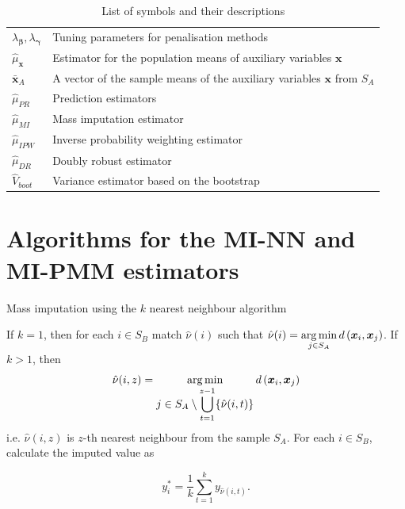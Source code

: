\documentclass[
]{jss}
\begin{document}
\begin{table}[ht!]
\begin{tabular}{ll}
$\lambda_{\boldsymbol{\beta}}, \lambda_{\boldsymbol{\gamma}}$ & Tuning parameters for penalisation methods \\
$\hat{\mu}_{\boldsymbol{x}}$ & Estimator for the population means of auxiliary variables $\boldsymbol{x}$ \\
$\bar{\boldsymbol{x}}_{A}$ & A vector of the sample means of the auxiliary variables $\boldsymbol{x}$ from $S_A$ \\ 
$\hat{\mu}_{PR}$ & Prediction estimators \\
$\hat{\mu}_{MI}$ & Mass imputation estimator \\
$\hat{\mu}_{IPW}$ & Inverse probability weighting estimator \\
$\hat{\mu}_{DR}$ & Doubly robust estimator \\
$\hat{V}_{boot}$ & Variance estimator based on the bootstrap \\
\hline
\end{tabular}
\caption{List of symbols and their descriptions}
\label{tab-list-of-symbols}
\end{table}

\section{Algorithms for the MI-NN and MI-PMM
estimators}\label{sec-details}

\begin{algorithm}[ht!]
\caption{Mass imputation using the $k$ nearest neighbour algorithm}
\label{algo-2}
\begin{algorithmic}[1]
\State If $k=1$, then for each $i \in S_B$ match $\hat{\nu}(i)$ such that
$\displaystyle \hat{\nu}(i)=
\operatornamewithlimits{arg\,min}_{j\in S_{A}}d\left(\boldsymbol{x}_i,\boldsymbol{x}_j\right)$.
\State If $k>1$, then
$$\hat{\nu}(i, z) = \operatornamewithlimits{arg\,min}_{\displaystyle j\in S_{A}\setminus\bigcup_{t=1}^{z-1}
\{\hat{\nu}(i, t)\}} d\left(\boldsymbol{x}_i, \boldsymbol{x}_j\right)$$
i.e. $\hat{\nu}(i, z)$ is $z$-th nearest neighbour from the sample $S_A$.\;
\State For each $i \in S_B$, calculate the imputed value as

$$
y_i^* = \frac{1}{k}\sum_{t=1}^{k}y_{\hat{\nu}(i, t)}.
$$
\end{algorithmic}
\end{algorithm}
\end{document}
